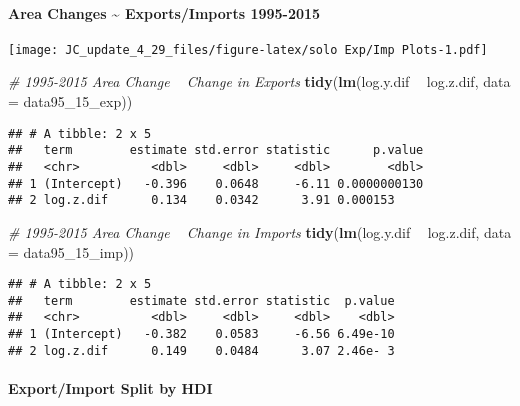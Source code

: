 \documentclass[
]{article}
\newenvironment{Shaded}{\begin{snugshade}}{\end{snugshade}}
\newcommand{\CommentTok}[1]{\textcolor[rgb]{0.56,0.35,0.01}{\textit{#1}}}
\newcommand{\DataTypeTok}[1]{\textcolor[rgb]{0.13,0.29,0.53}{#1}}
\newcommand{\DecValTok}[1]{\textcolor[rgb]{0.00,0.00,0.81}{#1}}
\newcommand{\KeywordTok}[1]{\textcolor[rgb]{0.13,0.29,0.53}{\textbf{#1}}}
\newcommand{\NormalTok}[1]{#1}
\newcommand{\OperatorTok}[1]{\textcolor[rgb]{0.81,0.36,0.00}{\textbf{#1}}}
\newcommand{\StringTok}[1]{\textcolor[rgb]{0.31,0.60,0.02}{#1}}
\begin{document}
\hypertarget{area-changes-exportsimports-1995-2015}{%
\paragraph{Area Changes \textasciitilde{} Exports/Imports
1995-2015}\label{area-changes-exportsimports-1995-2015}}

\texttt{[image: JC\_update\_4\_29\_files/figure-latex/solo Exp/Imp Plots-1.pdf]}

\begin{Shaded}
\begin{Highlighting}[]
\CommentTok{# 1995-2015 Area Change ~ Change in Exports}
\KeywordTok{tidy}\NormalTok{(}\KeywordTok{lm}\NormalTok{(log.y.dif }\OperatorTok{~}\StringTok{ }\NormalTok{log.z.dif, }\DataTypeTok{data =}\NormalTok{ data95_}\DecValTok{15}\NormalTok{_exp))}
\end{Highlighting}
\end{Shaded}

\begin{verbatim}
## # A tibble: 2 x 5
##   term        estimate std.error statistic      p.value
##   <chr>          <dbl>     <dbl>     <dbl>        <dbl>
## 1 (Intercept)   -0.396    0.0648     -6.11 0.0000000130
## 2 log.z.dif      0.134    0.0342      3.91 0.000153
\end{verbatim}

\begin{Shaded}
\begin{Highlighting}[]
\CommentTok{# 1995-2015 Area Change ~ Change in Imports}
\KeywordTok{tidy}\NormalTok{(}\KeywordTok{lm}\NormalTok{(log.y.dif }\OperatorTok{~}\StringTok{ }\NormalTok{log.z.dif, }\DataTypeTok{data =}\NormalTok{ data95_}\DecValTok{15}\NormalTok{_imp))}
\end{Highlighting}
\end{Shaded}

\begin{verbatim}
## # A tibble: 2 x 5
##   term        estimate std.error statistic  p.value
##   <chr>          <dbl>     <dbl>     <dbl>    <dbl>
## 1 (Intercept)   -0.382    0.0583     -6.56 6.49e-10
## 2 log.z.dif      0.149    0.0484      3.07 2.46e- 3
\end{verbatim}

\hypertarget{exportimport-split-by-hdi}{%
\paragraph{Export/Import Split by HDI}\label{exportimport-split-by-hdi}}
\end{document}
